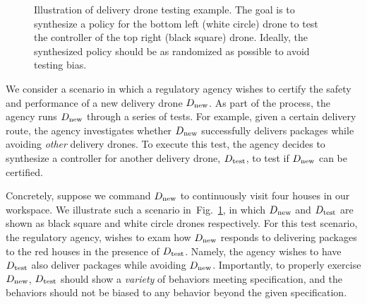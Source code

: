 
\begin{figure}
  \centering {}
  \caption{ Illustration of delivery drone testing example. The goal
    is to synthesize a policy for the bottom left (white circle) drone
    to test the controller of the top right (black square) drone. Ideally,
    the synthesized policy should be as randomized as possible to avoid
    testing bias.\label{fig:motivating} }
\end{figure}

We consider a scenario in which a regulatory agency
wishes to certify the safety and performance of a new delivery drone ${D_{\text{new}}}$.
As part of the process, the agency runs ${D_{\text{new}}}$ through a series of tests. For example, given a certain
delivery route, the agency investigates whether ${D_{\text{new}}}$ successfully delivers packages while
avoiding \emph{other} delivery drones. To execute this test, the agency decides to
synthesize a controller for another delivery drone, ${D_{\text{test}}}$, to test if
${D_{\text{new}}}$ can be certified.

Concretely,
suppose we command
${D_{\text{new}}}$ to continuously visit four houses in our workspace. We
illustrate such a scenario in~Fig.~\ref{fig:motivating}, in which
${D_{\text{new}}}$ and ${D_{\text{test}}}$ are shown as black square and white circle
drones respectively.  For this test scenario, the regulatory agency,
wishes to exam how ${D_{\text{new}}}$ responds to delivering packages to the
red houses in the presence of ${D_{\text{test}}}$. Namely, the
agency wishes to have ${D_{\text{test}}}$ also deliver packages while avoiding
${D_{\text{new}}}$. Importantly,
to properly exercise ${D_{\text{new}}}$, ${D_{\text{test}}}$ should show a \emph{variety} of behaviors meeting  specification, and the behaviors should not be biased to any behavior beyond the given specification.

